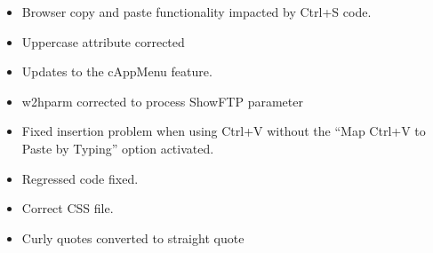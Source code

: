 \documentclass[letterpaper,10pt,english]{sphinxmanual}
\begin{document}
\begin{itemize}
\item {} 
Browser copy and paste functionality impacted by Ctrl+S code.

\end{itemize}

\begin{itemize}
\item {} 
Uppercase attribute corrected

\end{itemize}

\begin{itemize}
\item {} 
Updates to the cAppMenu feature.

\end{itemize}

\begin{itemize}
\item {} 
w2hparm corrected to process ShowFTP parameter

\end{itemize}

\begin{itemize}
\item {} 
Fixed insertion problem when using Ctrl+V without the “Map Ctrl+V to Paste by Typing” option activated.

\end{itemize}

\begin{itemize}
\item {} 
Regressed code fixed.

\end{itemize}

\begin{itemize}
\item {} 
Correct CSS file.

\end{itemize}

\begin{itemize}
\item {} 
Curly quotes converted to straight quote

\end{itemize}
\end{document}
